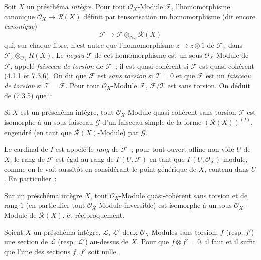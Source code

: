 \begin{env}[7.4.1]
\label{I.7.4.1-fr}
Soit $X$ un préschéma \emph{intègre}. Pour tout $\mathscr{O}_X$-Module
$\mathscr{F}$, l'homomorphisme canonique
$\mathscr{O}_X\to\mathscr{R}(X)$ définit par tensorisation un homomorphisme
(dit encore \emph{canonique})
\[
  \mathscr{F}\to
  \mathscr{F}\otimes_{\mathscr{O}_X}\mathscr{R}(X)
\]
qui, sur chaque fibre, n'est autre que l'homomorphisme $z\to z\otimes 1$ de
$\mathscr{F}_x$ dans
$\mathscr{F}_x\otimes_{\mathscr{O}_X}R(X)$. Le \emph{noyau $\mathscr{T}$}
de cet homomorphisme est un sous-$\mathscr{O}_X$-Module de $\mathscr{F}$,
appelé \emph{faisceau de torsion} de $\mathscr{F}$~; il est quasi-cohérent si
$\mathscr{F}$ est quasi-cohérent
(\hyperref[I.4.1.1-fr]{4.1.1} et \hyperref[I.7.3.6-fr]{7.3.6}). On dit que
$\mathscr{F}$ est \emph{sans torsion} si $\mathscr{T}=0$ et que
$\mathscr{F}$ est un \emph{faisceau de torsion} si
$\mathscr{T}=\mathscr{F}$. Pour tout $\mathscr{O}_X$-Module $\mathscr{F}$,
$\mathscr{F}/\mathscr{T}$ est sans torsion. On déduit de
(\hyperref[I.7.3.5-fr]{7.3.5}) que~:
\end{env}

\begin{proposition}[7.4.2]
\label{I.7.4.2-fr}
Si $X$ est un préschéma intègre, tout $\mathscr{O}_X$-Module quasi-cohérent
sans torsion $\mathscr{F}$ est isomorphe à un sous-faisceau $\mathscr{G}$
d'un faisceau simple de la forme $(\mathscr{R}(X))^{(I)}$, engendré (en tant
que $\mathscr{R}(X)$-Module) par $\mathscr{G}$.
\end{proposition}

Le cardinal de $I$ est appelé le \emph{rang} de $\mathscr{F}$~; pour tout
ouvert affine non vide $U$ de $X$, le rang de $\mathscr{F}$ est égal au rang
de $\Gamma(U,\mathscr{F})$ en tant que $\Gamma(U,\mathscr{O}_X)$-module,
comme on le voit aussitôt en considérant le point générique de $X$, contenu
dans $U$. En particulier~:

\begin{corollary}[7.4.3]
\label{I.7.4.3-fr}
Sur un préschéma intègre $X$, tout $\mathscr{O}_X$-Module quasi-cohérent sans
torsion et de rang $1$ (en particulier tout $\mathscr{O}_X$-Module
inversible) est isomorphe à un sous-$\mathscr{O}_X$-Module de
$\mathscr{R}(X)$, et réciproquement.
\end{corollary}

\begin{corollary}[7.4.4]
\label{I.7.4.4-fr}
Soient $X$ un préschéma intègre, $\mathscr{L}$, $\mathscr{L}'$ deux
$\mathscr{O}_X$-Modules sans torsion, $f$ \textup{(resp. $f'$)} une section de
$\mathscr{L}$ \textup{(resp. $\mathscr{L}'$)} au-dessus de $X$. Pour que
$f\otimes f'=0$, il faut et il suffit que l'une des sections $f$, $f'$ soit
nulle.
\end{corollary}

